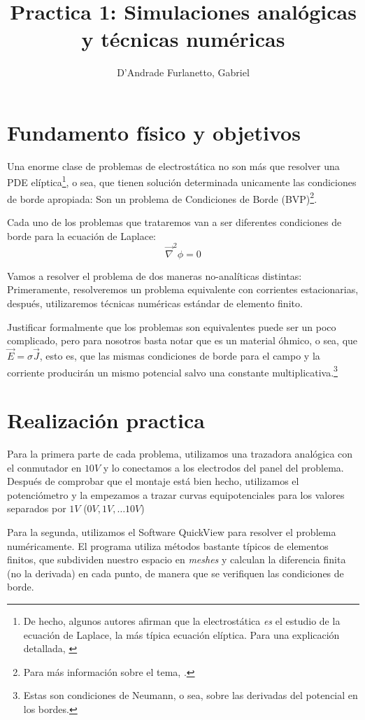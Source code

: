 \documentclass[a4paper,12pt]{article}
\begin{document}
\title{Practica 1: Simulaciones analógicas y técnicas numéricas}
\author{D'Andrade Furlanetto, Gabriel}
\maketitle

\section{Fundamento físico y objetivos}
Una enorme clase de problemas de electrostática no son más que resolver una PDE elíptica\footnote{De hecho, algunos autores afirman que la electrostática \textit{es} el estudio de la ecuación de Laplace, la más típica ecuación elíptica. Para una explicación detallada, \cite[111]{griffiths}}, o sea, que tienen solución determinada unicamente las condiciones de borde apropiada: Son un problema de Condiciones de Borde (BVP)\footnote{Para más información sobre el tema, \cite{pde}.}.

Cada uno de los problemas que trataremos van a ser diferentes condiciones de borde para la ecuación de Laplace:
$$\vec{\nabla}^2 \phi = 0 $$

Vamos a resolver el problema de dos maneras no-analíticas distintas: Primeramente, resolveremos un problema equivalente con corrientes estacionarias, después, utilizaremos técnicas numéricas estándar de elemento finito. 

Justificar formalmente que los problemas son equivalentes puede ser un poco complicado, pero para nosotros basta notar que es un material óhmico, o sea, que $\vec{E} = \sigma \vec{J}$, esto es, que las mismas condiciones de borde para el campo y la corriente producirán un mismo potencial salvo una constante multiplicativa.\footnote{Estas son condiciones de Neumann, o sea, sobre las derivadas del potencial en los bordes.} 

\section{Realización practica}

Para la primera parte de cada problema, utilizamos una trazadora analógica con el conmutador en $10V$ y lo conectamos a los electrodos del panel del problema. Después de comprobar que el montaje está bien hecho, utilizamos el potenciómetro y la empezamos a trazar curvas equipotenciales para los valores separados por $1V$ ($0V, 1V, \ldots 10 V$)

Para la segunda, utilizamos el Software QuickView para resolver el problema numéricamente. El programa utiliza métodos bastante típicos de elementos finitos, que subdividen nuestro espacio en \textit{meshes} y calculan la diferencia finita (no la derivada) en cada punto, de manera que se verifiquen las condiciones de borde.
\pagebreak
\end{document}
